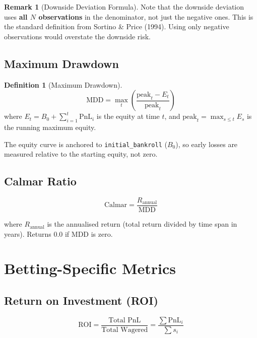 \documentclass[12pt,a4paper]{report}
\theoremstyle{definition}
\newtheorem{definition}{Definition}[chapter]
\newtheorem{remark}{Remark}[chapter]
\newcommand{\code}[1]{\texttt{#1}}
\newcommand{\pnl}{\text{PnL}}
\begin{document}
\begin{remark}[Downside Deviation Formula]
Note that the downside deviation uses \textbf{all $N$ observations} in the denominator, not just the negative ones. This is the standard definition from Sortino \& Price (1994). Using only negative observations would overstate the downside risk.
\end{remark}

\subsection{Maximum Drawdown}
\label{sec:max-drawdown}

\begin{definition}[Maximum Drawdown]
\begin{equation}
    \text{MDD} = \max_{t} \left(\frac{\text{peak}_t - E_t}{\text{peak}_t}\right)
    \label{eq:max-drawdown}
\end{equation}
where $E_t = B_0 + \sum_{i=1}^{t} \pnl_i$ is the equity at time $t$, and $\text{peak}_t = \max_{s \leq t} E_s$ is the running maximum equity.
\end{definition}

The equity curve is anchored to \code{initial\_bankroll} ($B_0$), so early losses are measured relative to the starting equity, not zero.

\subsection{Calmar Ratio}

\begin{equation}
    \text{Calmar} = \frac{R_{\text{annual}}}{\text{MDD}}
    \label{eq:calmar}
\end{equation}

where $R_{\text{annual}}$ is the annualised return (total return divided by time span in years). Returns 0.0 if MDD is zero.

\section{Betting-Specific Metrics}

\subsection{Return on Investment (ROI)}
\begin{equation}
    \text{ROI} = \frac{\text{Total PnL}}{\text{Total Wagered}} = \frac{\sum \pnl_i}{\sum s_i}
\end{equation}
\end{document}
